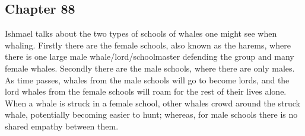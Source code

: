 \subsection{Chapter 88}

Ishmael talks about the two types of schools of whales one might see when
whaling. Firstly there are the female schools, also known as the harems, where
there is one large male whale/lord/schoolmaster defending the group and many
female whales. Secondly there are the male schools, where there are only males.
As time passes, whales from the male schools will go to become lords, and the
lord whales from the female schools will roam for the rest of their lives
alone. When a whale is struck in a female school, other whales crowd around the
struck whale, potentially becoming easier to hunt; whereas, for male schools
there is no shared empathy between them.
